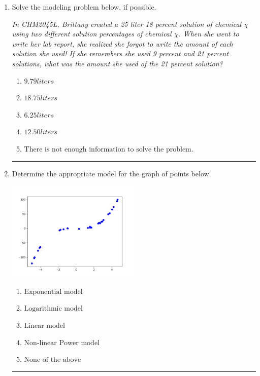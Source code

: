\documentclass[14pt]{extbook}
\newcommand{\litem}[1]{\item#1\hspace*{-1cm}\rule{\textwidth}{0.4pt}}
\begin{document}
\begin{enumerate}
{\begin{enumerate}[label=\Alph*.]
\end{enumerate} }
\litem{
Solve the modeling problem below, if possible.
\begin{center}
    \textit{ In CHM2045L, Brittany created a 25 liter 18 percent solution of chemical $\chi$ using two different solution percentages of chemical $\chi$. When she went to write her lab report, she realized she forgot to write the amount of each solution she used! If she remembers she used 9 percent and 21 percent solutions, what was the amount she used of the 21 percent solution? }
\end{center}
\begin{enumerate}[label=\Alph*.]
\item \( 9.79 liters \)
\item \( 18.75 liters \)
\item \( 6.25 liters \)
\item \( 12.50 liters \)
\item \( \text{There is not enough information to solve the problem.} \)

\end{enumerate} }
\litem{
Determine the appropriate model for the graph of points below.
\begin{center}
    \includegraphics[width=0.5\textwidth]{../Figures/identifyModelGraph12CopyB.png}
\end{center}
\begin{enumerate}[label=\Alph*.]
\item \( \text{Exponential model} \)
\item \( \text{Logarithmic model} \)
\item \( \text{Linear model} \)
\item \( \text{Non-linear Power model} \)
\item \( \text{None of the above} \)


\end{enumerate}}
\end{enumerate}
\end{document}
